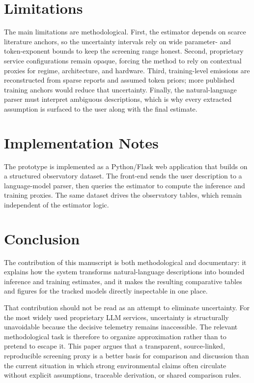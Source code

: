 \documentclass[runningheads]{llncs}
\begin{document}
\section{Limitations}
The main limitations are methodological. First, the estimator depends on scarce literature anchors, so the uncertainty intervals rely on wide parameter- and token-exponent bounds to keep the screening range honest. Second, proprietary service configurations remain opaque, forcing the method to rely on contextual proxies for regime, architecture, and hardware. Third, training-level emissions are reconstructed from sparse reports and assumed token priors; more published training anchors would reduce that uncertainty. Finally, the natural-language parser must interpret ambiguous descriptions, which is why every extracted assumption is surfaced to the user along with the final estimate.

\section{Implementation Notes}
The prototype is implemented as a Python/Flask web application that builds on a structured observatory dataset. The front-end sends the user description to a language-model parser, then queries the estimator to compute the inference and training proxies. The same dataset drives the observatory tables, which remain independent of the estimator logic.

\section{Conclusion}
The contribution of this manuscript is both methodological and documentary: it explains how the system transforms natural-language descriptions into bounded inference and training estimates, and it makes the resulting comparative tables and figures for the tracked models directly inspectable in one place.

That contribution should not be read as an attempt to eliminate uncertainty. For the most widely used proprietary LLM services, uncertainty is structurally unavoidable because the decisive telemetry remains inaccessible. The relevant methodological task is therefore to organize approximation rather than to pretend to escape it. This paper argues that a transparent, source-linked, reproducible screening proxy is a better basis for comparison and discussion than the current situation in which strong environmental claims often circulate without explicit assumptions, traceable derivation, or shared comparison rules.



\end{document}
